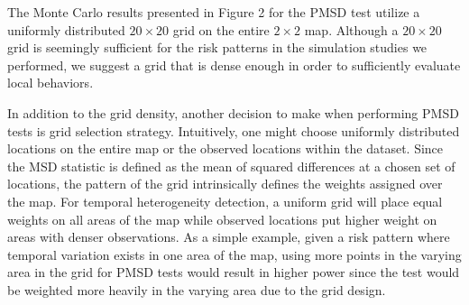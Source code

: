 	The Monte Carlo results presented in Figure 2 for the PMSD test utilize a uniformly distributed $20\times 20$ grid on the entire $2\times 2$ map. Although a $20\times 20$ grid is seemingly sufficient for the risk patterns in the simulation studies we performed, we suggest a grid that is dense enough in order to sufficiently evaluate local behaviors. 
	
	In addition to the grid density, another decision to make when performing PMSD tests is grid selection strategy. Intuitively, one might choose uniformly distributed locations on the entire map or the observed locations within the dataset. Since the MSD statistic is defined as the mean of squared differences at a chosen set of locations, the pattern of the grid intrinsically defines the weights assigned over the map. For temporal heterogeneity detection, a uniform grid will place equal weights on all areas of the map while observed locations put higher weight on areas with denser observations. As a simple example, given a risk pattern where temporal variation exists in one area of the map, using more points in the varying area in the grid for PMSD tests would result in higher power since the test would be weighted more heavily in the varying area due to the grid design. 
	
